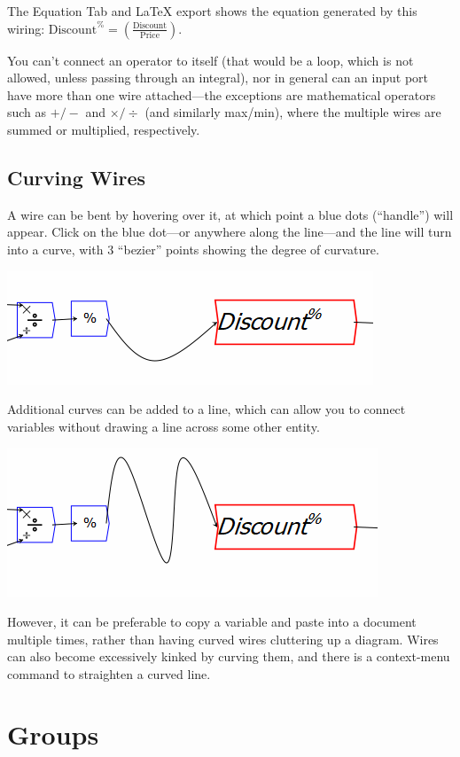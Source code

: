 The Equation Tab and LaTeX export shows the equation generated by
this wiring: $\mathrm{Discount}^{\%}=\left(\frac{\mathrm{Discount}}{\mathrm{Price}}\right)$.

You can't connect an operator to itself (that would be a loop, which
is not allowed, unless passing through an integral), nor in general
can an input port have more than one wire attached---the exceptions
are mathematical operators such as $+/-$ and $\times/\div$ (and
similarly max/min), where the multiple wires are summed or multiplied,
respectively.

\subsection{Curving Wires}

A wire can be bent by hovering over it, at which point a blue dots
(``handle'') will appear. Click on the blue dot---or anywhere along
the line---and the line will turn into a curve, with 3 ``bezier''
points showing the degree of curvature.

\includegraphics{images/CurvedLine01}

Additional curves can be added to a line, which can allow you to connect
variables without drawing a line across some other entity.

\includegraphics{images/CurvedLine02}

However, it can be preferable to copy a variable and paste into a
document multiple times, rather than having curved wires cluttering
up a diagram. Wires can also become excessively kinked by curving
them, and there is a context-menu command to straighten a curved line.

\section{Groups}

